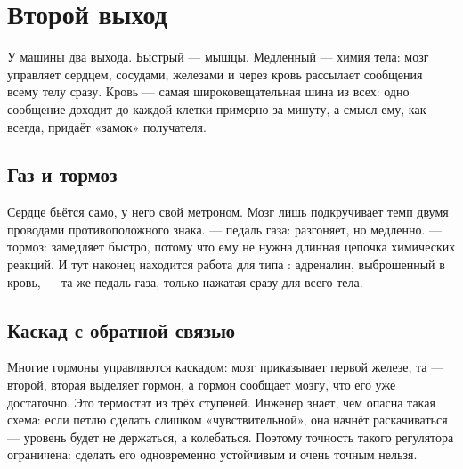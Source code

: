 \chapter{Второй выход}

У машины два выхода. Быстрый --- мышцы. Медленный --- химия тела: мозг управляет сердцем, сосудами, железами и через кровь рассылает сообщения всему телу сразу. Кровь --- самая широковещательная шина из всех: одно сообщение доходит до каждой клетки примерно за минуту, а смысл ему, как всегда, придаёт «замок» получателя.

\section*{Газ и тормоз}

Сердце бьётся само, у него свой метроном. Мозг лишь подкручивает темп двумя проводами противоположного знака.  --- педаль газа: разгоняет, но медленно.  --- тормоз: замедляет быстро, потому что ему не нужна длинная цепочка химических реакций. И тут наконец находится работа для типа : адреналин, выброшенный в кровь, --- та же педаль газа, только нажатая сразу для всего тела.


\section*{Каскад с обратной связью}

Многие гормоны управляются каскадом: мозг приказывает первой железе, та --- второй, вторая выделяет гормон, а гормон сообщает мозгу, что его уже достаточно. Это термостат из трёх ступеней. Инженер знает, чем опасна такая схема: если петлю сделать слишком «чувствительной», она начнёт раскачиваться --- уровень будет не держаться, а колебаться. Поэтому точность такого регулятора ограничена: сделать его одновременно устойчивым и очень точным нельзя.

